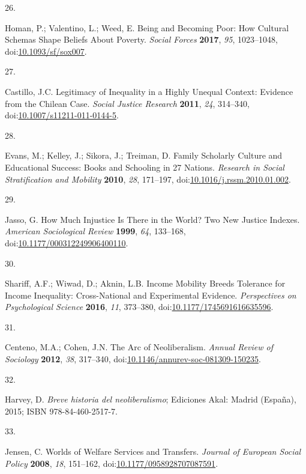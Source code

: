 \documentclass[
  12pt,
  letterpaper,
]{article}
\newlength{\cslhangindent}
\newlength{\csllabelwidth}
\newenvironment{CSLReferences}[2] %
 {\begin{list}{}{%
  \setlength{\itemindent}{0pt}
  \setlength{\leftmargin}{0pt}
  \setlength{\parsep}{0pt}
  \ifodd #1
   \setlength{\leftmargin}{\cslhangindent}
   \setlength{\itemindent}{-1\cslhangindent}
  \fi
  \setlength{\itemsep}{#2\baselineskip}}}
 {\end{list}}
\newcommand{\CSLLeftMargin}[1]{\parbox[t]{\csllabelwidth}{\strut#1\strut}}
\newcommand{\CSLRightInline}[1]{\parbox[t]{\linewidth - \csllabelwidth}{\strut#1\strut}}
\begin{document}
\begin{CSLReferences}{0}{0}
\CSLLeftMargin{26. }%
\CSLRightInline{Homan, P.; Valentino, L.; Weed, E. Being and {Becoming
Poor}: {How Cultural Schemas Shape Beliefs About Poverty}. \emph{Social
Forces} \textbf{2017}, \emph{95}, 1023--1048,
doi:\href{https://doi.org/10.1093/sf/sox007}{10.1093/sf/sox007}.}

\CSLLeftMargin{27. }%
\CSLRightInline{Castillo, J.C. Legitimacy of {Inequality} in a {Highly
Unequal Context}: {Evidence} from the {Chilean Case}. \emph{Social
Justice Research} \textbf{2011}, \emph{24}, 314--340,
doi:\href{https://doi.org/10.1007/s11211-011-0144-5}{10.1007/s11211-011-0144-5}.}

\CSLLeftMargin{28. }%
\CSLRightInline{Evans, M.; Kelley, J.; Sikora, J.; Treiman, D. Family
Scholarly Culture and Educational Success: {Books} and Schooling in 27
Nations. \emph{Research in Social Stratification and Mobility}
\textbf{2010}, \emph{28}, 171--197,
doi:\href{https://doi.org/10.1016/j.rssm.2010.01.002}{10.1016/j.rssm.2010.01.002}.}

\CSLLeftMargin{29. }%
\CSLRightInline{Jasso, G. How {Much Injustice} Is {There} in the
{World}? {Two New Justice Indexes}. \emph{American Sociological Review}
\textbf{1999}, \emph{64}, 133--168,
doi:\href{https://doi.org/10.1177/000312249906400110}{10.1177/000312249906400110}.}

\CSLLeftMargin{30. }%
\CSLRightInline{Shariff, A.F.; Wiwad, D.; Aknin, L.B. Income {Mobility
Breeds Tolerance} for {Income Inequality}: {Cross-National} and
{Experimental Evidence}. \emph{Perspectives on Psychological Science}
\textbf{2016}, \emph{11}, 373--380,
doi:\href{https://doi.org/10.1177/1745691616635596}{10.1177/1745691616635596}.}

\CSLLeftMargin{31. }%
\CSLRightInline{Centeno, M.A.; Cohen, J.N. The {Arc} of {Neoliberalism}.
\emph{Annual Review of Sociology} \textbf{2012}, \emph{38}, 317--340,
doi:\href{https://doi.org/10.1146/annurev-soc-081309-150235}{10.1146/annurev-soc-081309-150235}.}

\CSLLeftMargin{32. }%
\CSLRightInline{Harvey, D. \emph{{Breve historia del neoliberalismo}};
Ediciones Akal: Madrid (Espa{ñ}a), 2015; ISBN 978-84-460-2517-7.}

\CSLLeftMargin{33. }%
\CSLRightInline{Jensen, C. Worlds of Welfare Services and Transfers.
\emph{Journal of European Social Policy} \textbf{2008}, \emph{18},
151--162,
doi:\href{https://doi.org/10.1177/0958928707087591}{10.1177/0958928707087591}.}


\end{CSLReferences}
\end{document}
